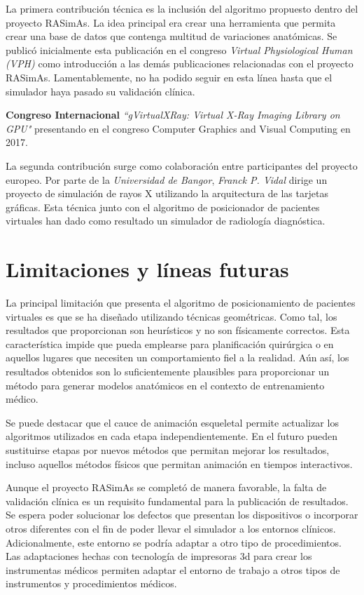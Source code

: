 La primera contribución técnica es la inclusión del algoritmo propuesto dentro del proyecto \ac{RASimAs}. La idea principal era crear una herramienta que permita crear una base de datos que contenga multitud de variaciones anatómicas.  Se publicó inicialmente esta publicación en el congreso \emph{ Virtual Physiological Human (VPH)} como introducción a las demás publicaciones relacionadas con el proyecto \ac{RASimAs}. Lamentablemente, no ha podido seguir en esta línea hasta que el simulador haya pasado su validación clínica.

\textbf{ Congreso Internacional }\emph{``gVirtualXRay: Virtual X-Ray Imaging Library on GPU"}\cite{sujar:hal} presentando en el congreso Computer Graphics and Visual Computing en 2017.

La segunda contribución surge como colaboración entre participantes del proyecto europeo. Por parte de la \emph{Universidad de Bangor}, \emph{Franck P. Vidal} \cite{gVirtualXRay} dirige un proyecto de simulación de rayos X utilizando la arquitectura de las tarjetas gráficas. Esta técnica junto con el algoritmo de posicionador de pacientes virtuales han dado como resultado un simulador de radiología diagnóstica.




\section{Limitaciones y líneas futuras}
\label{conclu:future}
La principal limitación que presenta el algoritmo  de posicionamiento de pacientes virtuales es que se ha diseñado utilizando técnicas geométricas. Como tal, los resultados que proporcionan son heurísticos y no son físicamente correctos. Esta característica impide que pueda emplearse para planificación quirúrgica o en aquellos lugares que necesiten un comportamiento fiel a la realidad. Aún así, los resultados obtenidos son lo suficientemente plausibles para proporcionar un método para generar modelos anatómicos en el contexto de entrenamiento médico.

Se puede destacar que el cauce de animación esqueletal permite actualizar los algoritmos utilizados en cada etapa independientemente. En el futuro pueden sustituirse etapas por nuevos métodos que permitan mejorar los resultados, incluso aquellos métodos físicos que permitan animación en tiempos interactivos.

Aunque el proyecto \ac{RASimAs} se completó de manera favorable, la falta de validación clínica es un requisito fundamental para la publicación de resultados. Se espera poder solucionar los defectos que presentan los dispositivos o incorporar otros diferentes con el fin de poder llevar el simulador a los entornos clínicos.
Adicionalmente, este entorno se podría adaptar a otro tipo de procedimientos. Las adaptaciones hechas con tecnología de impresoras 3d para crear los instrumentas médicos permiten adaptar el entorno de trabajo a otros tipos de instrumentos y procedimientos médicos.

